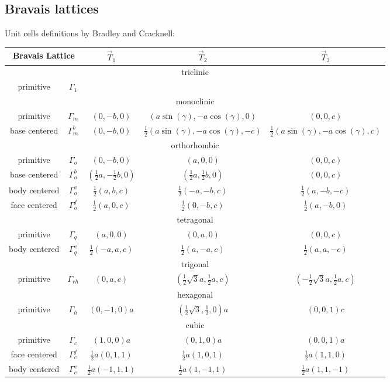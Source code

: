 \documentclass[final,12pt]{article}
\begin{document}
{{{{{{\subsection{Bravais lattices}
Unit cells definitions by Bradley and Cracknell\cite{bradley72_book}:
\begin{center}
\begin{tabular}{|c|c|c|c|c|}
\hline
\multicolumn{2}{|c|}{Bravais Lattice} & $\vec{T}_1$& $\vec{T}_2$& $\vec{T}_3$\\
\hline
\hline
\multicolumn{5}{|c|}{triclinic}\\
\hline
primitive & $\Gamma_1$ & & &\\
\hline
%
\hline
\multicolumn{5}{|c|}{monoclinic}\\
\hline
primitive & $\Gamma_m$ & 
$(0,-b,0)$ & 
$(a\sin(\gamma),-a\cos(\gamma),0)$ 
&$(0,0,c)$ \\
base centered & $\Gamma_m^b$ & 
$(0,-b,0)$ & 
$\frac{1}{2}(a\sin(\gamma),-a\cos(\gamma),-c)$ &
$\frac{1}{2}(a\sin(\gamma),-a\cos(\gamma),c)$ \\
\hline
%
\hline
\hline
\multicolumn{5}{|c|}{orthorhombic}\\
\hline
primitive & $\Gamma_o$ & 
$(0,-b,0)$ & 
$(a,0,0)$ 
&$(0,0,c)$ \\
base centered & $\Gamma_o^b$ & 
$(\frac{1}{2}a,-\frac{1}{2}b,0)$ & 
$(\frac{1}{2}a,\frac{1}{2}b,0)$ & 
$(0,0,c)$ \\
body centered & $\Gamma_o^v$ & 
$\frac{1}{2}(a,b,c)$ & 
$\frac{1}{2}(-a,-b,c)$ & 
$\frac{1}{2}(a,-b,-c)$ \\
face centered & $\Gamma_o^f$ & 
$\frac{1}{2}(a,0,c)$ & 
$\frac{1}{2}(0,-b,c)$ & 
$\frac{1}{2}(a,-b,0)$ \\
\hline
%
\hline
\multicolumn{5}{|c|}{tetragonal}\\
\hline
primitive & $\Gamma_q$ & 
$(a,0,0)$ & 
$(0,a,0)$ 
&$(0,0,c)$ \\
\hline
body centered &$\Gamma_q^v$ & 
$\frac{1}{2}(-a,a,c)$ & 
$\frac{1}{2}(a,-a,c)$ & 
$\frac{1}{2}(a,a,-c)$ \\
\hline
%
\hline
\multicolumn{5}{|c|}{trigonal}\\
\hline
primitive & $\Gamma_{rh}$ & 
$(0,a,c)$ & 
$(\frac{1}{2}\sqrt{3}a,\frac{1}{2}a,c)$ &
$(-\frac{1}{2}\sqrt{3}a,\frac{1}{2}a,c)$ \\
\hline
%
\hline
\multicolumn{5}{|c|}{hexagonal}\\
\hline
primitive & $\Gamma_h$ & 
$(0,-1,0)a$ & 
$(\frac{1}{2}\sqrt{3},\frac{1}{2},0)a$ &
$(0,0,1)c$\\
\hline
%
\hline
\multicolumn{5}{|c|}{cubic}\\
\hline
primitive & $\Gamma_c$ & 
$(1,0,0)a$ & 
$(0,1,0)a$ & 
$(0,0,1)a$ \\
face centered & $\Gamma_c^f$ & 
$\frac{1}{2}a(0,1,1)$ & 
$\frac{1}{2}a(1,0,1)$ & 
$\frac{1}{2}a(1,1,0)$ \\
body centered & $\Gamma_c^v$ & 
$\frac{1}{2}a(-1,1,1)$ & 
$\frac{1}{2}a(1,-1,1)$ & 
$\frac{1}{2}a(1,1,-1)$ \\
\hline
\end{tabular}
\end{center}

}}}}}}
\end{document}
